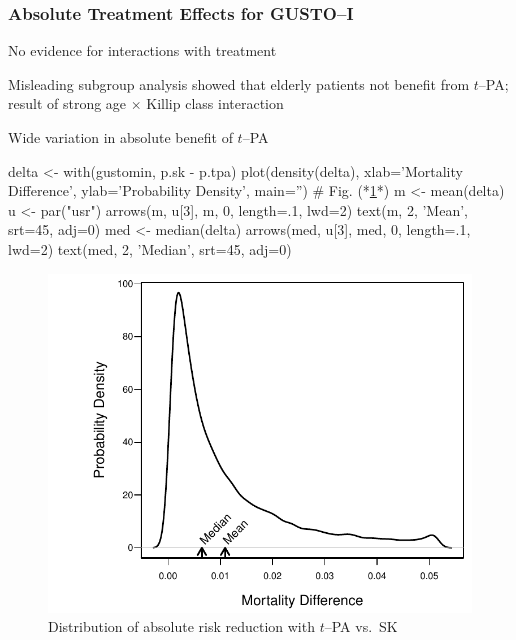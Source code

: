 \subsubsection{Absolute Treatment Effects for GUSTO--I}
\bi
\item   No evidence for interactions with treatment
\item   Misleading subgroup analysis showed that elderly patients not
        benefit from $t$--PA; result of strong age $\times$ Killip
        class interaction
\item   Wide variation in absolute benefit of $t$--PA \ipacue
\begin{Schunk}
\begin{Sinput}
delta <- with(gustomin, p.sk - p.tpa)
plot(density(delta), xlab='Mortality Difference',
     ylab='Probability Density', main='')    # Fig. (*\ref{fig:ancova-gusto-histdelt}*)
m <- mean(delta)
u <- par("usr")
arrows(m, u[3], m, 0, length=.1, lwd=2)
text(m, 2, 'Mean', srt=45, adj=0)
med <- median(delta)
arrows(med, u[3], med, 0, length=.1, lwd=2)
text(med, 2, 'Median', srt=45, adj=0)
\end{Sinput}
\begin{figure}[htbp]

\centerline{\includegraphics{ancova-gusto-histdelt-1} }

\caption[Absolute benefit vs.\ baseline risk]{Distribution of absolute risk reduction with $t$--PA vs.\ SK}\label{fig:ancova-gusto-histdelt}
\end{figure}
\end{Schunk}
